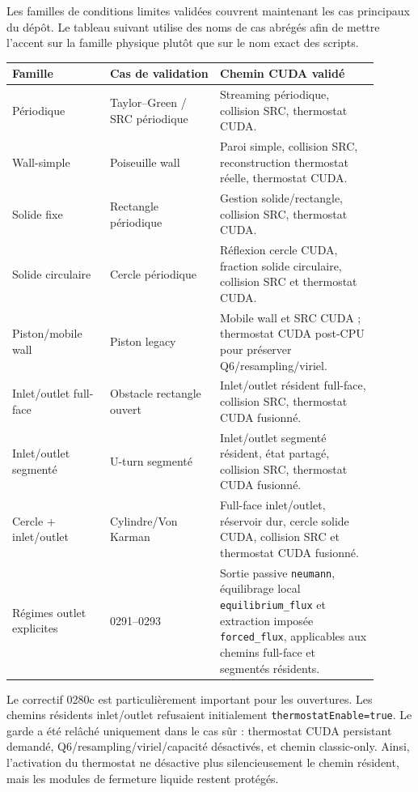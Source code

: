 \documentclass[11pt,a4paper]{article}
\begin{document}
Les familles de conditions limites validées couvrent maintenant les cas principaux du dépôt. Le tableau suivant utilise des noms de cas abrégés afin de mettre l'accent sur la famille physique plutôt que sur le nom exact des scripts.
\begin{center}
\begin{tabular}{p{0.24\linewidth}p{0.27\linewidth}p{0.39\linewidth}}
\toprule
Famille & Cas de validation & Chemin CUDA validé \\
\midrule
Périodique & Taylor--Green / SRC périodique & Streaming périodique, collision SRC, thermostat CUDA. \\
Wall-simple & Poiseuille wall & Paroi simple, collision SRC, reconstruction thermostat réelle, thermostat CUDA. \\
Solide fixe & Rectangle périodique & Gestion solide/rectangle, collision SRC, thermostat CUDA. \\
Solide circulaire & Cercle périodique & Réflexion cercle CUDA, fraction solide circulaire, collision SRC et thermostat CUDA. \\
Piston/mobile wall & Piston legacy & Mobile wall et SRC CUDA ; thermostat CUDA post-CPU pour préserver Q6/resampling/viriel. \\
Inlet/outlet full-face & Obstacle rectangle ouvert & Inlet/outlet résident full-face, collision SRC, thermostat CUDA fusionné. \\
Inlet/outlet segmenté & U-turn segmenté & Inlet/outlet segmenté résident, état partagé, collision SRC, thermostat CUDA fusionné. \\
Cercle + inlet/outlet & Cylindre/Von Karman & Full-face inlet/outlet, réservoir dur, cercle solide CUDA, collision SRC et thermostat CUDA fusionné. \\
Régimes outlet explicites & 0291--0293 & Sortie passive \texttt{neumann}, équilibrage local \texttt{equilibrium\_flux} et extraction imposée \texttt{forced\_flux}, applicables aux chemins full-face et segmentés résidents. \\
\bottomrule
\end{tabular}
\end{center}

Le correctif 0280c est particulièrement important pour les ouvertures. Les chemins résidents inlet/outlet refusaient initialement \texttt{thermostatEnable=true}. Le garde a été relâché uniquement dans le cas sûr : thermostat CUDA persistant demandé, Q6/resampling/viriel/capacité désactivés, et chemin classic-only. Ainsi, l'activation du thermostat ne désactive plus silencieusement le chemin résident, mais les modules de fermeture liquide restent protégés.
\end{document}
